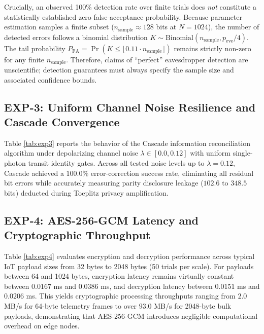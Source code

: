 \documentclass[journal,10pt,twocolumn]{article}
\begin{document}
Crucially, an observed 100\% detection rate over finite trials does \emph{not} constitute a statistically established zero false-acceptance probability. Because parameter estimation samples a finite subset ($n_{\text{sample}} \approx 128$ bits at $N=1024$), the number of detected errors follows a binomial distribution $K \sim \text{Binomial}(n_{\text{sample}}, p_{\text{eve}}/4)$. The tail probability $P_{\text{FA}} = \Pr(K \le \lfloor 0.11 \cdot n_{\text{sample}} \rfloor)$ remains strictly non-zero for any finite $n_{\text{sample}}$. Therefore, claims of ``perfect'' eavesdropper detection are unscientific; detection guarantees must always specify the sample size and associated confidence bounds.

\subsection{EXP-3: Uniform Channel Noise Resilience and Cascade Convergence}
Table \ref{tab:exp3} reports the behavior of the Cascade information reconciliation algorithm under depolarizing channel noise $\lambda \in [0.0, 0.12]$ with uniform single-photon transit identity gates. Across all tested noise levels up to $\lambda = 0.12$, Cascade achieved a $100.0\%$ error-correction success rate, eliminating all residual bit errors while accurately measuring parity disclosure leakage ($102.6$ to $348.5$ bits) deducted during Toeplitz privacy amplification.

\subsection{EXP-4: AES-256-GCM Latency and Cryptographic Throughput}
Table \ref{tab:exp4} evaluates encryption and decryption performance across typical IoT payload sizes from 32 bytes to 2048 bytes (50 trials per scale). For payloads between 64 and 1024 bytes, encryption latency remains virtually constant between $0.0167$ ms and $0.0386$ ms, and decryption latency between $0.0151$ ms and $0.0206$ ms. This yields cryptographic processing throughputs ranging from $2.0$ MB/s for 64-byte telemetry frames to over $93.0$ MB/s for 2048-byte bulk payloads, demonstrating that AES-256-GCM introduces negligible computational overhead on edge nodes.
\end{document}
